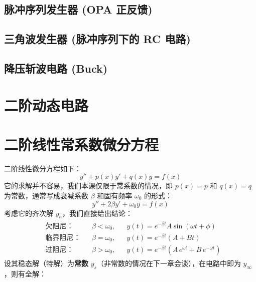 \documentclass[UTF8]{report}
\theoremstyle{MyLineTheoremStyle} %
\theoremstyle{MyBlockTheoremStyle} %
\theoremstyle{MySubsubsectionStyle} %
\begin{document}
\subsection{脉冲序列发生器 (OPA 正反馈)}
\subsection{三角波发生器 (脉冲序列下的 RC 电路)}
\subsection{降压斩波电路 (Buck)}

\section{二阶动态电路}
\section{二阶线性常系数微分方程}
二阶线性微分方程如下：
\begin{equation}
y'' + p(x)y' + q(x)y = f(x)
\end{equation}
它的求解并不容易，我们本课仅限于常系数的情况，即 $p(x) = p$ 和 $q(x) = q$ 为常数，通常写成衰减系数 $\beta$ 和固有频率 $\omega_0$ 的形式：
\begin{equation}
y'' + 2\beta y' + \omega_0 y = f(x)
\end{equation}
考虑它的齐次解 $y_h$，我们直接给出结论：
\begin{gather}
\begin{aligned}
    &\text{欠阻尼：} &&\beta < \omega_0, &&y(t) = e^{-\beta t} A\sin \left( \omega t + \phi \right) \\ 
    &\text{临界阻尼：} &&\beta = \omega_0, &&y(t) = e^{-\beta t} (A + Bt) \\
    &\text{过阻尼：} &&\beta > \omega_0, &&y(t) = e^{-\beta t}\left( A\,e^{\omega t} + B\,e^{-\omega t}\right)
\end{aligned}
\end{gather}
设其稳态解（特解）为\textbf{常数} $y_s$（非常数的情况在下一章会谈），在电路中即为 $y_\infty$，则有全解：
\end{document}
